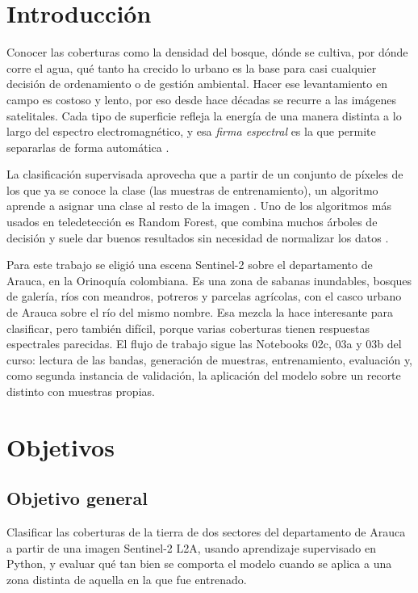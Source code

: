 \documentclass[11pt,letterpaper]{article}
\begin{document}
\tableofcontents
\vspace{0.6cm}

\section{Introducción}

Conocer las coberturas como la densidad del bosque, dónde se cultiva, por dónde corre el agua, qué
tanto ha crecido lo urbano es la base para casi cualquier decisión de ordenamiento o de gestión ambiental.
Hacer ese levantamiento en campo es costoso y lento, por eso desde hace décadas se recurre a las imágenes
satelitales. Cada tipo de superficie refleja la energía de una manera distinta a lo largo del espectro
electromagnético, y esa \emph{firma espectral} es la que permite separarlas de forma automática
\citep{chuvieco2010}.

La clasificación supervisada aprovecha que a partir de un conjunto de píxeles de los que ya se
conoce la clase (las muestras de entrenamiento), un algoritmo aprende a asignar una clase al resto de la
imagen \citep{gulich}. Uno de los algoritmos más usados en teledetección es Random Forest, que combina
muchos árboles de decisión y suele dar buenos resultados sin necesidad de normalizar los datos
\citep{breiman2001}.

Para este trabajo se eligió una escena Sentinel-2 sobre el departamento de Arauca, en la Orinoquía colombiana.
Es una zona de sabanas inundables, bosques de galería, ríos con meandros, potreros y parcelas agrícolas, con el
casco urbano de Arauca sobre el río del mismo nombre. Esa mezcla la hace interesante para clasificar, pero
también difícil, porque varias coberturas tienen respuestas espectrales parecidas. El flujo de trabajo sigue
las Notebooks 02c, 03a y 03b del curso: lectura de las bandas, generación de muestras, entrenamiento,
evaluación y, como segunda instancia de validación, la aplicación del modelo sobre un recorte distinto con muestras propias.

\section{Objetivos}
\subsection{Objetivo general}
Clasificar las coberturas de la tierra de dos sectores del departamento de Arauca a partir de una imagen
Sentinel-2 L2A, usando aprendizaje supervisado en Python, y evaluar qué tan bien se comporta el modelo
cuando se aplica a una zona distinta de aquella en la que fue entrenado.
\end{document}
